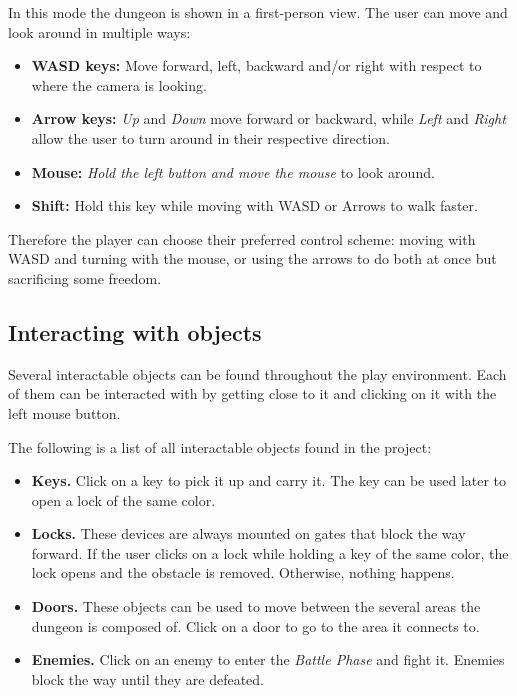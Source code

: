 In this mode the dungeon is shown in a first-person view. The user can move and look around in multiple ways:

\begin{itemize}
    \item \textbf{WASD keys:} Move forward, left, backward and/or right with respect to where the camera is looking.
    \item \textbf{Arrow keys:} \textit{Up} and \textit{Down} move forward or backward, while \textit{Left} and \textit{Right} allow the user to turn around in their respective direction.
    \item \textbf{Mouse:} \textit{Hold the left button and move the mouse} to look around.
    \item \textbf{Shift:} Hold this key while moving with WASD or Arrows to walk faster.
\end{itemize}

Therefore the player can choose their preferred control scheme: moving with WASD and turning with the mouse, or using the arrows to do both at once but sacrificing some freedom.

\subsection{Interacting with objects}

Several interactable objects can be found throughout the play environment. Each of them can be interacted with by getting close to it and clicking on it with the left mouse button.



The following is a list of all interactable objects found in the project:

\begin{itemize}
    \item \textbf{Keys.} Click on a key to pick it up and carry it. The key can be used later to open a lock of the same color.
    \item \textbf{Locks.} These devices are always mounted on gates that block the way forward. If the user clicks on a lock while holding a key of the same color, the lock opens and the obstacle is removed. Otherwise, nothing happens.
    \item \textbf{Doors.} These objects can be used to move between the several areas the dungeon is composed of. Click on a door to go to the area it connects to.
    \item \textbf{Enemies.} Click on an enemy to enter the \textit{Battle Phase} and fight it. Enemies block the way until they are defeated.
\end{itemize}

